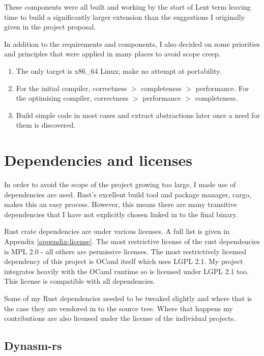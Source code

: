 These components were all built and working by the start of Lent term leaving time to build a
significantly larger extension than the suggestions I originally given in the project proposal.

In addition to the requirements and components, I also decided on some priorities and principles
that were applied in many places to avoid scope creep.

\begin{enumerate}
    \item The only target is x86\_64 Linux; make no attempt at portability.
    \item For the initial compiler, correctness $>$ completeness $>$ performance. For the
          optimising compiler, correctness $>$ performance $>$ completeness.
    \item Build simple code in most cases and extract abstractions later once a need for them is
          discovered.
\end{enumerate}

\section{Dependencies and licenses}

In order to avoid the scope of the project growing too large, I made use of dependencies are used.
Rust's excellent build tool and package manager, cargo, makes this an easy process. However, this
means there are many transitive dependencies that I have not explicitly chosen linked in to the
final binary.

Rust crate dependencies are under various licenses. A full list is given in Appendix
\ref{appendix-license}. The most restrictive license of the rust dependencies is MPL 2.0 - all
others are permissive licenses. The most restrictively licensed dependency of this project is OCaml
itself which uses LGPL 2.1. My project integrates heavily with the OCaml runtime so is licensed
under LGPL 2.1 too. This license is compatible with all dependencies.

Some of my Rust dependencies needed to be tweaked slightly and where that is the case they are
vendored in to the source tree. Where that happens my contributions are also licensed under the
license of the individual projects.

\subsection{Dynasm-rs}

